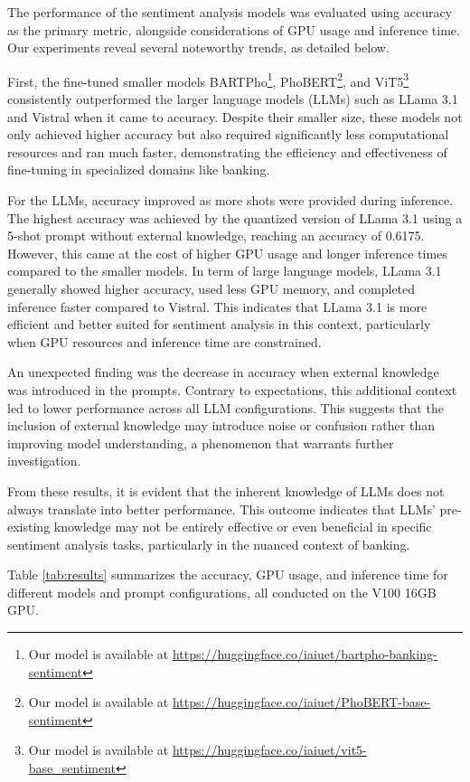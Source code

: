 {The performance of the sentiment analysis models was evaluated using accuracy as the primary metric, alongside considerations of GPU usage and inference time. Our experiments reveal several noteworthy trends, as detailed below.

First, the fine-tuned smaller models BARTPho\footnote{Our model is available at \url{https://huggingface.co/iaiuet/bartpho-banking-sentiment}}, PhoBERT\footnote{Our model is available at \url{https://huggingface.co/iaiuet/PhoBERT-base-sentiment}}, and ViT5\footnote{Our model is available at \url{https://huggingface.co/iaiuet/vit5-base_sentiment}} consistently outperformed the larger language models (LLMs) such as LLama 3.1 and Vistral when it came to accuracy. Despite their smaller size, these models not only achieved higher accuracy but also required significantly less computational resources and ran much faster, demonstrating the efficiency and effectiveness of fine-tuning in specialized domains like banking.

For the LLMs, accuracy improved as more shots were provided during inference. The highest accuracy was achieved by the quantized version of LLama 3.1 using a 5-shot prompt without external knowledge, reaching an accuracy of 0.6175. However, this came at the cost of higher GPU usage and longer inference times compared to the smaller models. In term of large language models, LLama 3.1 generally showed higher accuracy, used less GPU memory, and completed inference faster compared to Vistral. This indicates that LLama 3.1 is more efficient and better suited for sentiment analysis in this context, particularly when GPU resources and inference time are constrained.

An unexpected finding was the decrease in accuracy when external knowledge was introduced in the prompts. Contrary to expectations, this additional context led to lower performance across all LLM configurations. This suggests that the inclusion of external knowledge may introduce noise or confusion rather than improving model understanding, a phenomenon that warrants further investigation.

From these results, it is evident that the inherent knowledge of LLMs does not always translate into better performance. This outcome indicates that LLMs' pre-existing knowledge may not be entirely effective or even beneficial in specific sentiment analysis tasks, particularly in the nuanced context of banking.

Table \ref{tab:results} summarizes the accuracy, GPU usage, and inference time for different models and prompt configurations, all conducted on the V100 16GB GPU.

}
